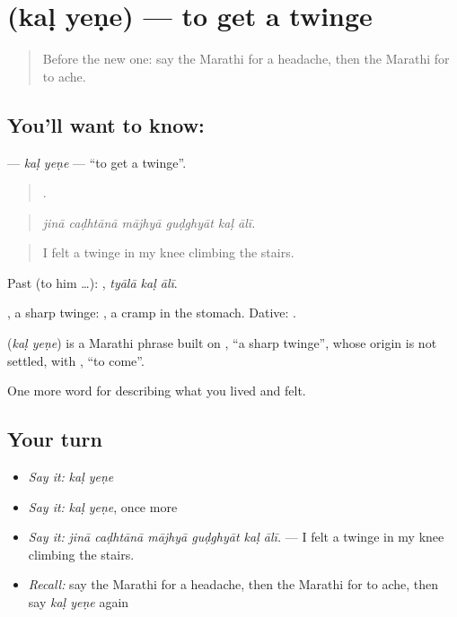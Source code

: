 \section[\texorpdfstring{\mr{कळ} \mr{येणे} (kaḷ yeṇe)}{कळ येणे (kaḷ yeṇe)}]{  (kaḷ yeṇe) — to get a twinge}

\label{lesson:MR-C482-kal-yene}



\begin{quote}
Before the new one: say the Marathi for a headache, then the Marathi for to ache.
\end{quote}

\subsection*{You'll want to know:  }
\textbf{ } — \emph{kaḷ yeṇe} — \textquotedblleft{}to get a twinge\textquotedblright{}.

\begin{quote}
     .
\end{quote}

\begin{quote}
\emph{jinā caḍhtānā mājhyā guḍghyāt kaḷ ālī.}
\end{quote}

\begin{quote}
I felt a twinge in my knee climbing the stairs.
\end{quote}

Past (to him …):   , \emph{tyālā kaḷ ālī}.

, a sharp twinge:   , a cramp in the stomach. Dative:   .

\begin{cousinweb}
\textbf{ } (\emph{kaḷ yeṇe}) is a Marathi phrase built on , \textquotedblleft{}a sharp twinge\textquotedblright{}, whose origin is not settled, with , \textquotedblleft{}to come\textquotedblright{}.
\end{cousinweb}

\begin{grammarlens}[title={What you've built}]
One more word for describing what you lived and felt.
\end{grammarlens}

\subsection*{Your turn}
\begin{itemize}
\raggedright
  \item \emph{Say it:} \emph{kaḷ yeṇe}
  \item \emph{Say it:} \emph{kaḷ yeṇe}, once more
  \item \emph{Say it:} \emph{jinā caḍhtānā mājhyā guḍghyāt kaḷ ālī.} — I felt a twinge in my knee climbing the stairs.
  \item \emph{Recall:} say the Marathi for a headache, then the Marathi for to ache, then say \emph{kaḷ yeṇe} again
\end{itemize}

